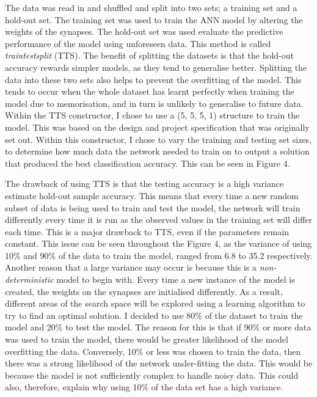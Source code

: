 \documentclass[11pt]{article}
\begin{document}
The data was read in and shuffled and split into two sets;  a training set and a hold-out set. The training set was used to train the ANN model by altering the weights of the synapses. The hold-out set was used evaluate the predictive performance of the model using unforeseen data. This method is called \textit{train\textunderscore test\textunderscore split} (TTS). The benefit of splitting the datasets is that the hold-out accuracy rewards simpler models, as they tend to generalise better. Splitting the data into these two sets also helps to prevent the overfitting of the model. This tends to occur when the whole dataset has learnt perfectly when training the model due to memorisation, and in turn is unlikely to generalise to future data.
Within the TTS constructor, I chose to use a (5, 5, 5, 1) structure to train the model. This was based on the design and project specification that was originally set out. Within this constructor, I chose to vary the training and testing set sizes, to determine how much data the network needed to train on to output a solution that produced the best classification accuracy. This can be seen in Figure 4. 

The drawback of using TTS is that the testing accuracy is a high variance estimate hold-out sample accuracy. This means that every time a new random subset  of data is being used to train and test the model,  the network will train differently every time it is run as the observed values in the training set will differ each time. This is a major drawback to TTS, even if the parameters remain constant. 
This issue can be seen throughout the Figure 4, as the variance of using 10\% and  90\% of the data to train the model, ranged from 6.8 to 35.2 respectively.  Another reason that a large variance may occur is because this is a \textit{non-deterministic} model to begin with. Every time a new instance of the model is created, the weights on the synapses are initialised differently. As a result, different areas of the search space will be explored using a learning algorithm to try to find an optimal solution. 
I decided to use 80\% of the dataset to train the model and 20\% to test the model. The reason for this is that if 90\% or more data was used to train the model, there would be greater likelihood of the model overfitting the data. Conversely, 10\% or less was chosen to train the data, then there was a strong likelihood of the network under-fitting the data. This would be because the model is not sufficiently complex to handle noisy data. This could also, therefore, explain why using 10\% of the data set has a high variance. 
\end{document}
